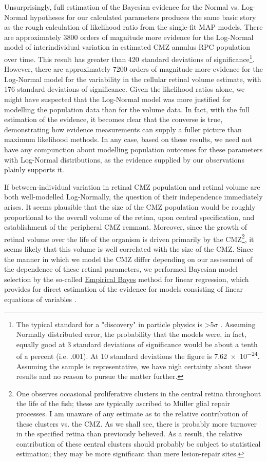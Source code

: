 Unsurprisingly, full estimation of the Bayesian evidence for the Normal vs. Log-Normal hypotheses for our calculated parameters produces the same basic story as the rough calculation of likelihood ratio from the single-fit MAP models. There are approximately 3800 orders of magnitude more evidence for the Log-Normal model of interindividual variation in estimated CMZ annulus RPC population over time. This result has greater than 420 standard deviations of significance\footnote{The typical standard for a "discovery" in particle physics is >5$\sigma$ \cite{Lyons2013}. Assuming Normally distributed error, the probability that the models were, in fact, equally good at 3 standard deviations of significance would be about a tenth of a percent (i.e. .001). At 10 standard deviations the figure is \num{7.62e-24}. Assuming the sample is representative, we have nigh certainty about these results and no reason to pursue the matter further.}. However, there are approximately 7200 orders of magnitude more evidence for the Log-Normal model for the variability in the cellular retinal volume estimate, with 176 standard deviations of significance. Given the likelihood ratios alone, we might have suspected that the Log-Normal model was more justified for modelling the population data than for the volume data. In fact, with the full estimation of the evidence, it becomes clear that the converse is true, demonstrating how evidence measurements can supply a fuller picture than maximum likelihood methods. In any case, based on these results, we need not have any compunction about modelling population outcomes for these parameters with Log-Normal distributions, as the evidence supplied by our observations plainly supports it.

If between-individual variation in retinal CMZ population and retinal volume are both well-modelled Log-Normally, the question of their independence immediately arises. It seems plausible that the size of the CMZ population would be roughly proportional to the overall volume of the retina, upon central specification, and establishment of the peripheral CMZ remnant. Moreover, since the growth of retinal volume over the life of the organism is driven primarily by the CMZ\footnote{One observes occasional proliferative clusters in the central retina throughout the life of the fish; these are typically ascribed to M\"{u}ller glial repair processes. I am unaware of any estimate as to the relative contribution of these clusters vs. the CMZ. As we shall see, there is probably more turnover in the specified retina than previously believed. As a result, the relative contribution of these central clusters should probably be subject to statistical estimation; they may be more significant than mere lesion-repair sites.}, it seems likely that this volume is well correlated with the size of the CMZ. Since the manner in which we model the CMZ differ depending on our assessment of the dependence of these retinal parameters, we performed Bayesian model selection by the so-called \hyperref[EmpircalBayes]{Empirical Bayes} method for linear regression, which provides for direct estimation of the evidence for models consisting of linear equations of variables \cite{Bishop2006}.

